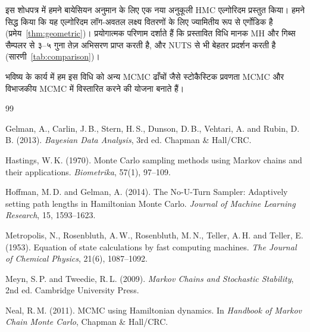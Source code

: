 \documentclass[12pt,a4paper]{article}
\theoremstyle{plain}
\theoremstyle{definition}
\theoremstyle{remark}
\begin{document}
इस शोधपत्र में हमने बायेसियन अनुमान के लिए एक नया अनुकूली
HMC एल्गोरिदम प्रस्तुत किया। हमने सिद्ध किया कि यह
एल्गोरिदम लॉग-अवतल लक्ष्य वितरणों के लिए ज्यामितीय
रूप से एर्गोडिक है (प्रमेय~\ref{thm:geometric})।
प्रयोगात्मक परिणाम दर्शाते हैं कि प्रस्तावित विधि मानक
MH और गिब्स सैम्पलर से ३--५ गुना तेज़ अभिसरण प्राप्त
करती है, और NUTS से भी बेहतर प्रदर्शन करती है
(सारणी~\ref{tab:comparison})।

भविष्य के कार्य में हम इस विधि को अन्य MCMC ढाँचों
जैसे स्टोकैस्टिक प्रवणता MCMC और विभाजकीय MCMC
में विस्तारित करने की योजना बनाते हैं।

\begin{thebibliography}{99}

Gelman, A., Carlin, J.\,B., Stern, H.\,S., Dunson, D.\,B.,
Vehtari, A. and Rubin, D.\,B. (2013).
\emph{Bayesian Data Analysis}, 3rd ed.
Chapman \& Hall/CRC.

Hastings, W.\,K. (1970).
Monte Carlo sampling methods using Markov chains and their applications.
\emph{Biometrika}, 57(1), 97--109.

Hoffman, M.\,D. and Gelman, A. (2014).
The No-U-Turn Sampler: Adaptively setting path lengths in Hamiltonian Monte Carlo.
\emph{Journal of Machine Learning Research}, 15, 1593--1623.

Metropolis, N., Rosenbluth, A.\,W., Rosenbluth, M.\,N.,
Teller, A.\,H. and Teller, E. (1953).
Equation of state calculations by fast computing machines.
\emph{The Journal of Chemical Physics}, 21(6), 1087--1092.

Meyn, S.\,P. and Tweedie, R.\,L. (2009).
\emph{Markov Chains and Stochastic Stability}, 2nd ed.
Cambridge University Press.

Neal, R.\,M. (2011).
MCMC using Hamiltonian dynamics.
In \emph{Handbook of Markov Chain Monte Carlo}, Chapman \& Hall/CRC.

\end{thebibliography}
\end{document}
